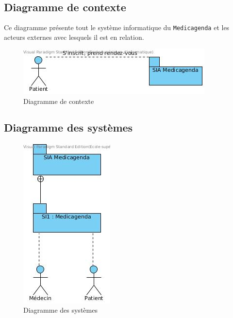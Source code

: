 \documentclass[a4paper, 11pt]{report}
\begin{document}
\subsection{\label{dc}Diagramme de contexte}
Ce diagramme présente tout le système informatique du \texttt{Medicagenda} et les acteurs 
externes avec lesquels il est en relation. 
\begin{figure}[hb]
	\centering
	\includegraphics[scale=0.7]{contexte.jpg}
	\caption{Diagramme de contexte}
	\label{fig:contexte}
\end{figure}
\subsection{Diagramme des systèmes}
\begin{figure}[hb]
	\centering
	\includegraphics[scale=0.7]{systemes.jpg}
	\caption{Diagramme des systèmes}
	\label{fig:systemes}
\end{figure}
\newpage
\end{document}
